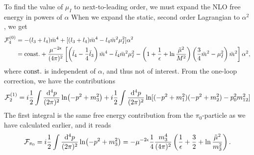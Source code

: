 To find the value of $\mu_I$ to next-to-leading order, we must expand the NLO free energy in powers of $\alpha$
When we expand the static, second order Lagrangian to $\alpha^2$, we get
\begin{align}
    \mathcal{F}_4^{(0)}
    &= - (l_3 + l_4)\bar m^4 + [(l_3 + l_4)\bar m^4 -l_4 \bar m^2\mu_I^2]\alpha^2
    \\
    & =
    \mathrm{const.} + 
    \frac{\mu^{-2\epsilon}}{(4\pi)^2}
    \left[
        \left(
            \bar l_4 - \frac{1}{4}\bar l_3
        \right)\bar m^4
        -\bar l_4\bar m^2\mu_I^2
        -\left(
            1 + \frac{1}{\epsilon} + \ln\frac{\tilde \mu^2}{M^2}
        \right)
        \left(\frac{3}{4}\bar m^2 - \mu_I^2\right)\bar m^2
    \right]\alpha^2,
\end{align}
where $\mathrm{const.}$ is independent of $\alpha$, and thus not of interest.
From the one-loop correction, we have the contributions
\begin{equation}
    \mathcal{F}_2^{(1)} = i \frac{1}{2}\int \frac{\dd^4 p}{(2\pi)^2} \ln(-p^2 + m_3^2)
    +  i \frac{1}{2} \int \frac{\dd^4 p}{(2\pi)^2} \ln[(-p^2 + m_1^2)(-p^2 + m_2^2) - p_0^2 m_{12}^2]
\end{equation}
The first integral is the same free energy contribution from the $\pi_0$-particle as we have calculated earlier, and it reads
\begin{equation}
    \mathcal{F}_{\pi_0} 
    = i \frac{1}{2}\int \frac{\dd^4 p}{(2\pi)^2} \ln(-p^2 + m_3^2)
    = - \mu^{-2\epsilon}\frac{1}{4} \frac{m_3^4}{(4 \pi)^2}
    \left(\frac{1}{\epsilon} + \frac{3}{2} + \ln \frac{\tilde \mu^2}{m_3^2}\right).
\end{equation}
